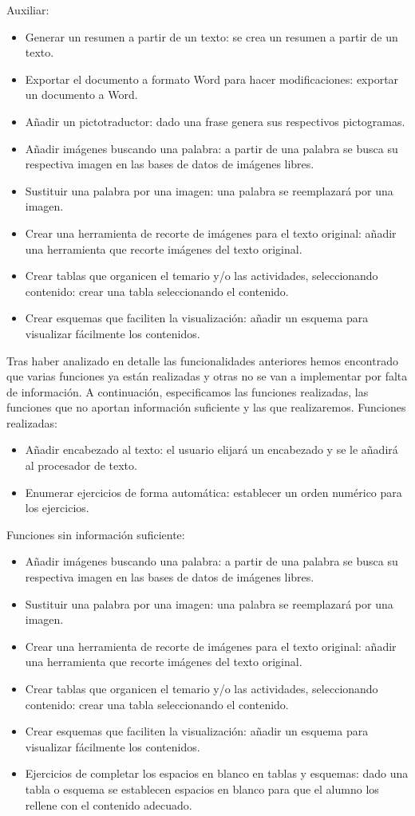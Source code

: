 Auxiliar:
\begin{itemize}
  \item Generar un resumen a partir de un texto: se crea un resumen a partir de un texto.
  \item Exportar el documento a formato Word para hacer modificaciones: exportar un documento a Word.
  \item Añadir un pictotraductor: dado una frase genera sus respectivos pictogramas.
  \item Añadir imágenes buscando una palabra: a partir de una palabra se busca su respectiva imagen en las bases de datos de imágenes libres.
  \item Sustituir una palabra por una imagen: una palabra se reemplazará por una imagen.
  \item Crear una herramienta de recorte de imágenes para el texto original: añadir una herramienta que recorte imágenes del texto original.
  \item Crear tablas que organicen el temario y/o las actividades, seleccionando contenido:  crear una tabla seleccionando el contenido.
  \item Crear esquemas que faciliten la visualización: añadir un esquema para visualizar fácilmente los contenidos.
\end{itemize}
Tras haber analizado en detalle las funcionalidades anteriores hemos encontrado que varias funciones ya están realizadas y otras no se van a implementar por falta de información. A continuación, especificamos las funciones realizadas, las funciones que no aportan información suficiente y las que realizaremos.
\newline
Funciones realizadas:
  \begin{itemize}
    \item Añadir encabezado al texto: el usuario elijará un encabezado y se le añadirá al procesador de texto.
    \item Enumerar ejercicios de forma automática: establecer un orden numérico para los ejercicios.
  \end{itemize}
Funciones sin información suficiente:
\begin{itemize}
  \item Añadir imágenes buscando una palabra: a partir de una palabra se busca su respectiva imagen en las bases de datos de imágenes libres.
  \item Sustituir una palabra por una imagen: una palabra se reemplazará por una imagen.
  \item Crear una herramienta de recorte de imágenes para el texto original: añadir una herramienta que recorte imágenes del texto original.
  \item Crear tablas que organicen el temario y/o las actividades, seleccionando contenido:  crear una tabla seleccionando el contenido.
  \item Crear esquemas que faciliten la visualización: añadir un esquema para visualizar fácilmente los contenidos.
  \item Ejercicios de completar los espacios en blanco en tablas y esquemas: dado una tabla o esquema se establecen espacios en blanco para que el alumno los rellene con el contenido adecuado.
\end{itemize}

